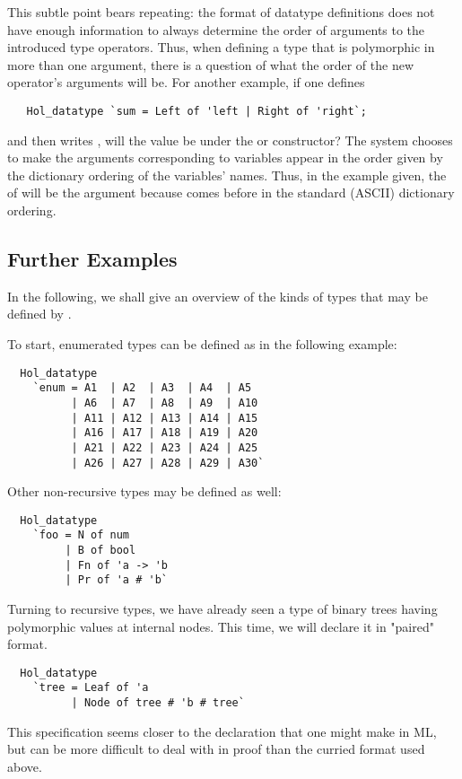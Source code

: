 This subtle point bears repeating: the format of datatype definitions
does not have enough information to always determine the order of
arguments to the introduced type operators. Thus, when defining a type
that is polymorphic in more than one argument, there is a question of
what the order of the new operator's arguments will be.  For another
example, if one defines
%
\begin{hol}
\begin{verbatim}
   Hol_datatype `sum = Left of 'left | Right of 'right`;
\end{verbatim}
\end{hol}
%
and then writes , will the  value be under the
 or  constructor?  The system chooses to make the
arguments corresponding to variables appear in the order given by the
dictionary ordering of the variables' names.  Thus, in the example
given, the  of  will be the  argument
because  comes before  in the standard (ASCII)
dictionary ordering.

\subsection{Further Examples}

 In the following, we shall give an overview of the kinds of types that
 may be defined by .

 To start, enumerated types can be defined as in the following example:
\begin{hol}
\begin{verbatim}
  Hol_datatype 
    `enum = A1  | A2  | A3  | A4  | A5
          | A6  | A7  | A8  | A9  | A10
          | A11 | A12 | A13 | A14 | A15
          | A16 | A17 | A18 | A19 | A20
          | A21 | A22 | A23 | A24 | A25
          | A26 | A27 | A28 | A29 | A30`
\end{verbatim}
\end{hol}
%
Other non-recursive types may be defined as well:
\begin{hol}
\begin{verbatim}
  Hol_datatype 
    `foo = N of num
         | B of bool
         | Fn of 'a -> 'b
         | Pr of 'a # 'b`
\end{verbatim}
\end{hol}
% 
Turning to recursive types, we have already seen a type of binary 
trees having polymorphic values at internal nodes. This time, we will 
declare it in "paired" format.
\begin{hol}
\begin{verbatim}
  Hol_datatype 
    `tree = Leaf of 'a
          | Node of tree # 'b # tree`
\end{verbatim}
\end{hol}
% 
This specification seems closer to the declaration that one might make
in ML, but can be more difficult to deal with in proof than the curried format
used above.

